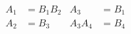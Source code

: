 \documentclass{book}
\begin{document}
\setcounter{chapter}{2}

\begin{align}
A_{1} & = B_{1}B_{2} & A_{3} & = B_{1}\\
A_{2} & = B_{3} & A_{3}A_{4} & = B_{4}
\end{align}
\end{document}
